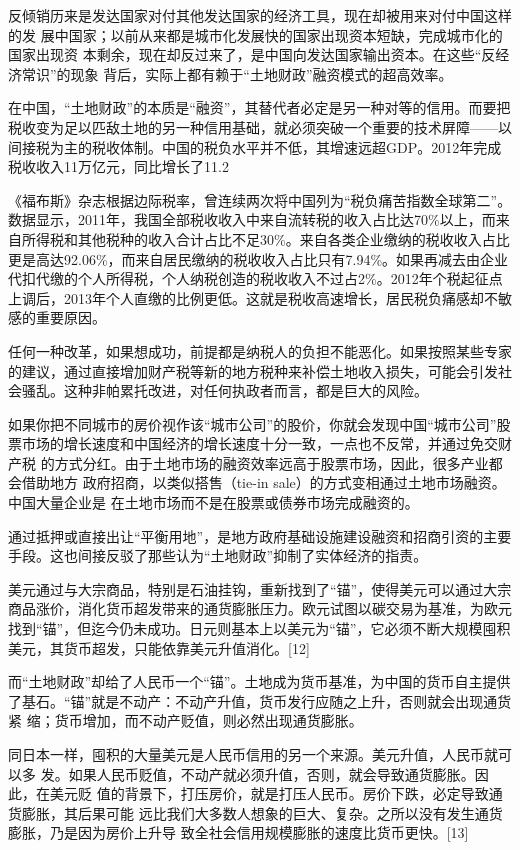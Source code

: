 反倾销历来是发达国家对付其他发达国家的经济工具，现在却被用来对付中国这样的发
展中国家；以前从来都是城市化发展快的国家出现资本短缺，完成城市化的国家出现资
本剩余，现在却反过来了，是中国向发达国家输出资本。在这些“反经济常识”的现象
背后，实际上都有赖于“土地财政”融资模式的超高效率。

在中国，“土地财政”的本质是“融资”，其替代者必定是另一种对等的信用。而要把税收变为足以匹敌土地的另一种信用基础，就必须突破一个重要的技术屏障——以间接税为主的税收体制。中国的税负水平并不低，其增速远超GDP。2012年完成税收收入11万亿元，同比增长了11.2%

《福布斯》杂志根据边际税率，曾连续两次将中国列为“税负痛苦指数全球第二”。
数据显示，2011年，我国全部税收收入中来自流转税的收入占比达70\%以上，而来自所得税和其他税种的收入合计占比不足30\%。来自各类企业缴纳的税收收入占比更是高达92.06\%，而来自居民缴纳的税收收入占比只有7.94\%。如果再减去由企业代扣代缴的个人所得税，个人纳税创造的税收收入不过占2\%。2012年个税起征点上调后，2013年个人直缴的比例更低。这就是税收高速增长，居民税负痛感却不敏感的重要原因。

任何一种改革，如果想成功，前提都是纳税人的负担不能恶化。如果按照某些专家的建议，通过直接增加财产税等新的地方税种来补偿土地收入损失，可能会引发社会骚乱。这种非帕累托改进，对任何执政者而言，都是巨大的风险。

如果你把不同城市的房价视作该“城市公司”的股价，你就会发现中国“城市公司”股
票市场的增长速度和中国经济的增长速度十分一致，一点也不反常，并通过免交财产税
的方式分红。由于土地市场的融资效率远高于股票市场，因此，很多产业都会借助地方
政府招商，以类似搭售（tie-in sale）的方式变相通过土地市场融资。中国大量企业是
在土地市场而不是在股票或债券市场完成融资的。

通过抵押或直接出让“平衡用地”，是地方政府基础设施建设融资和招商引资的主要手段。这也间接反驳了那些认为“土地财政”抑制了实体经济的指责。

美元通过与大宗商品，特别是石油挂钩，重新找到了“锚”，使得美元可以通过大宗商品涨价，消化货币超发带来的通货膨胀压力。欧元试图以碳交易为基准，为欧元找到“锚”，但迄今仍未成功。日元则基本上以美元为“锚”，它必须不断大规模囤积美元，其货币超发，只能依靠美元升值消化。[12]

而“土地财政”却给了人民币一个“锚”。土地成为货币基准，为中国的货币自主提供
了基石。“锚”就是不动产：不动产升值，货币发行应随之上升，否则就会出现通货紧
缩；货币增加，而不动产贬值，则必然出现通货膨胀。

同日本一样，囤积的大量美元是人民币信用的另一个来源。美元升值，人民币就可以多
发。如果人民币贬值，不动产就必须升值，否则，就会导致通货膨胀。因此，在美元贬
值的背景下，打压房价，就是打压人民币。房价下跌，必定导致通货膨胀，其后果可能
远比我们大多数人想象的巨大、复杂。之所以没有发生通货膨胀，乃是因为房价上升导
致全社会信用规模膨胀的速度比货币更快。[13]

